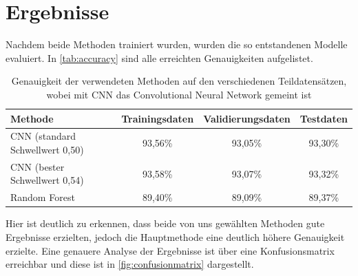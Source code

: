 \section{Ergebnisse}
\label{sec:Ergebnisse}

Nachdem beide Methoden trainiert wurden, wurden die so entstandenen Modelle evaluiert.
In \autoref{tab:accuracy} sind alle erreichten Genauigkeiten aufgelistet.

\begin{table}
    \centering
    \caption{Genauigkeit der verwendeten Methoden auf den verschiedenen Teildatensätzen, wobei mit CNN das Convolutional Neural Network gemeint ist}
    \label{tab:accuracy}
    \begin{tabular}{l c c c}
        \toprule 
        Methode & Trainingsdaten & Validierungsdaten & Testdaten \\ 
        \midrule 
        CNN (standard Schwellwert 0,50) & 93,56\% & 93,05\% & 93,30\% \\
        CNN (bester Schwellwert 0,54) & 93,58\% & 93,07\% & 93,32\% \\
        Random Forest & 89,40\% & 89,09\% & 89,37\% \\
        \bottomrule
    \end{tabular}
\end{table}

Hier ist deutlich zu erkennen, dass beide von uns gewählten Methoden gute Ergebnisse erzielten, jedoch die Hauptmethode eine deutlich höhere Genauigkeit erzielte.
Eine genauere Analyse der Ergebnisse ist über eine Konfusionsmatrix erreichbar und diese ist in \autoref{fig:confusionmatrix} dargestellt.

